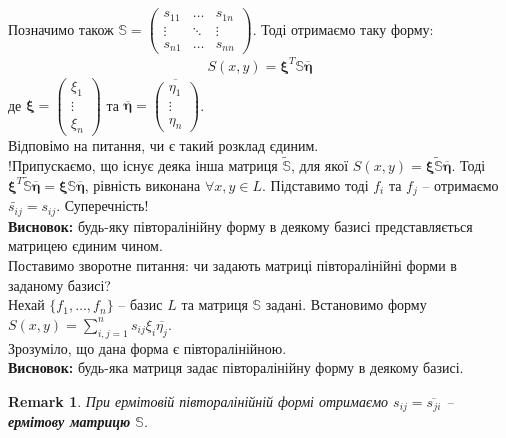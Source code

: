 \documentclass[a4paper, 10pt]{article}
\theoremstyle{theoremdd}
\newtheorem{remark}[theorem]{Remark}
\begin{document}
Позначимо також $\mathbb{S} = \begin{pmatrix}
s_{11} & \dots & s_{1n} \\
\vdots & \ddots & \vdots \\
s_{n1} & \dots & s_{nn}
\end{pmatrix}$. Тоді отримаємо таку форму:
\begin{align*}
S(x,y) = \bm{\xi}^T \mathbb{S} \overline{\bm{\eta}}
\end{align*}
де $\bm{\xi} = \begin{pmatrix}
\xi_1 \\ \vdots \\ \xi_n
\end{pmatrix}$ та $\overline{\bm{\eta}} = \overline{\begin{pmatrix}
\eta_1 \\ \vdots \\ \eta_n
\end{pmatrix}}$.\\
Відповімо на питання, чи є такий розклад єдиним. \\
!Припускаємо, що існує деяка інша матриця $\widetilde{\mathbb{S}}$, для якої $S(x,y) = \bm{\xi} \widetilde{\mathbb{S}} \overline{\bm{\eta}}$. Тоді $\bm{\xi}^T \widetilde{\mathbb{S}} \overline{\bm{\eta}} = \bm{\xi} \mathbb{S} \overline{\bm{\eta}}$, рівність виконана $\forall x,y \in L$. Підставимо тоді $f_i$ та $f_j$ -- отримаємо $\widetilde{s_{ij}} = s_{ij}$. Суперечність!\\
\textbf{Висновок:} будь-яку півторалінійну форму в деякому базисі представляється матрицею єдиним чином.
\bigskip \\
Поставимо зворотне питання: чи задають матриці півторалінійні форми в заданому базисі?\\
Нехай $\{f_1,\dots,f_n\}$ -- базис $L$ та матриця $\mathbb{S}$ задані. Встановимо форму $S(x,y) = \displaystyle\sum_{i,j=1}^n s_{ij}\xi_i \overline{\eta_j}$.\\
Зрозуміло, що дана форма є півторалінійною.\\
\textbf{Висновок:} будь-яка матриця задає півторалінійну форму в деякому базисі.

\begin{remark}
При ермітовій півторалінійній формі отримаємо $s_{ij} = \overline{s_{ji}}$ -- \textbf{ермітову матрицю} $\mathbb{S}$.
\end{remark}
\end{document}

